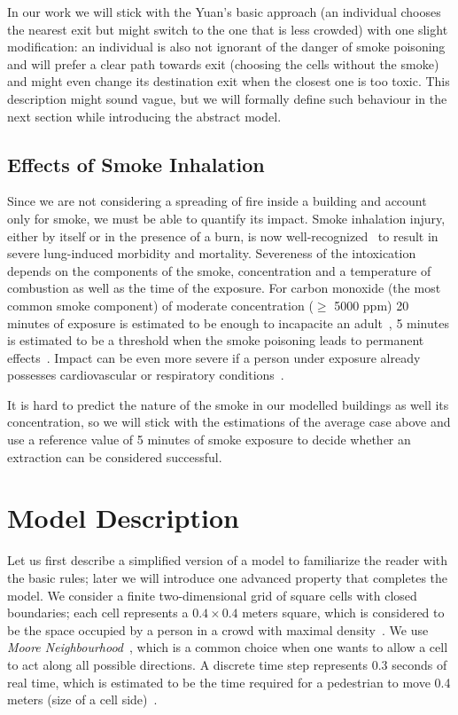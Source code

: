 In our work we will stick with the Yuan's basic approach (an individual chooses
the nearest exit but might switch to the one that is less crowded) with one
slight modification: an individual is also not ignorant of the danger
of smoke poisoning and will prefer a clear path towards exit (choosing the
cells without the smoke) and might even change its destination exit when the
closest one is too toxic.
This description might sound vague, but we will formally define such behaviour
in the next section while introducing the abstract model.

\subsection{Effects of Smoke Inhalation}
Since we are not considering a spreading of fire inside a building and account
only for smoke, we must be able to quantify its impact.
Smoke inhalation injury, either by itself or in the presence of a burn, is now
well-recognized~\cite{NCBI} to result in severe lung-induced morbidity and
mortality.
Severeness of the intoxication depends on the components of the smoke,
concentration and a temperature of combustion as well as the time of the
exposure.
For carbon monoxide (the most common smoke component) of moderate concentration
($\geq$ 5000 ppm) 20 minutes of exposure is estimated to be enough to incapacite
an adult~\cite{CO1}, 5 minutes is estimated to be a threshold when
the smoke poisoning leads to permanent effects~\cite{NCBI, CO2}.
Impact can be even more severe if a person under exposure already possesses
cardiovascular or respiratory conditions~\cite{NCBI, Inhalation}.

It is hard to predict the nature of the smoke in our modelled buildings as well
its concentration, so we will stick with the estimations of the average case
above and use a reference value of 5 minutes of smoke exposure to decide
whether an extraction can be considered successful.

\section{Model Description}
Let us first describe a simplified version of a model to familiarize the reader
with  the basic rules; later we will introduce one advanced property that
completes the model.
We consider a finite two-dimensional grid of square cells with closed
boundaries; each cell represents a $0.4 \times 0.4$ meters square, which is
considered to be the space occupied by a person in a crowd with maximal
density~\cite{Density1, Density2}.
We use \emph{Moore Neighbourhood}~\cite{Moore}, which is a common choice when
one wants to allow a cell to act along all possible directions.
A discrete time step represents 0.3 seconds of real time, which is estimated to
be  the time required for a pedestrian to move 0.4 meters (size of a cell
side)~\cite{Density1}.

